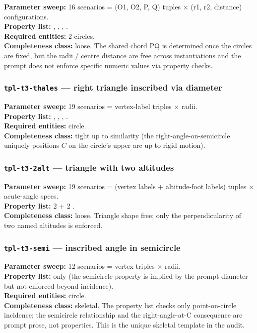 \textbf{Parameter sweep:} 16 scenarios = (O1, O2, P, Q) tuples $\times$ (r1, r2, distance) configurations.\\
\textbf{Property list:} , , , .\\
\textbf{Required entities:} 2 circles.\\
\textbf{Completeness class:} loose. The shared chord PQ is determined once the circles are fixed, but the radii / centre distance are free across instantiations and the prompt does not enforce specific numeric values via property checks.

\subsubsection{\texttt{tpl-t3-thales} --- right triangle inscribed via diameter}

\textbf{Parameter sweep:} 19 scenarios = vertex-label triples $\times$ radii.\\
\textbf{Property list:} , , , .\\
\textbf{Required entities:} circle.\\
\textbf{Completeness class:} tight up to similarity (the right-angle-on-semicircle uniquely positions $C$ on the circle's upper arc up to rigid motion).

\subsubsection{\texttt{tpl-t3-2alt} --- triangle with two altitudes}

\textbf{Parameter sweep:} 19 scenarios = (vertex labels + altitude-foot labels) tuples $\times$ acute-angle specs.\\
\textbf{Property list:} 2  + 2 .\\
\textbf{Completeness class:} loose. Triangle shape free; only the perpendicularity of two named altitudes is enforced.

\subsubsection{\texttt{tpl-t3-semi} --- inscribed angle in semicircle}

\textbf{Parameter sweep:} 12 scenarios = vertex triples $\times$ radii.\\
\textbf{Property list:}  only (the semicircle property is implied by the prompt diameter but not enforced beyond incidence).\\
\textbf{Required entities:} circle.\\
\textbf{Completeness class:} skeletal. The property list checks only point-on-circle incidence; the semicircle relationship and the right-angle-at-C consequence are prompt prose, not properties. This is the unique skeletal template in the audit.

